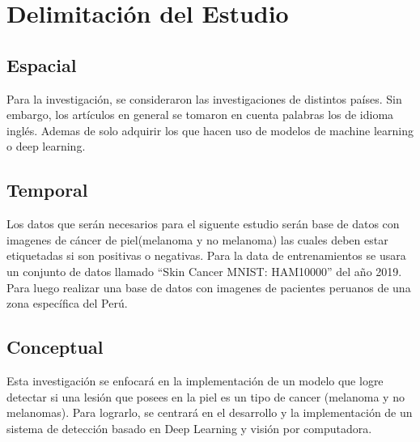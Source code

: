 \section{Delimitación del Estudio}

\subsection{Espacial}
Para la investigación, se consideraron las investigaciones de distintos países. Sin embargo, los artículos en general se tomaron en cuenta palabras los de idioma inglés. Ademas de solo adquirir los que hacen uso de modelos de machine learning o deep learning.

\subsection{Temporal}
Los datos que serán necesarios para el siguente estudio serán base de datos con imagenes de cáncer de piel(melanoma y no melanoma) las cuales deben estar etiquetadas si son positivas o negativas.
Para la data de entrenamientos se usara un conjunto de datos llamado “Skin Cancer MNIST: HAM10000” del año 2019. Para luego realizar una base de datos con imagenes de pacientes peruanos de una zona específica del Perú.


\subsection{Conceptual}
Esta investigación se enfocará en la implementación de un modelo que logre detectar si una lesión que posees en la piel es un tipo de cancer (melanoma y no melanomas). Para lograrlo, se centrará en el desarrollo y la implementación de un sistema de detección basado en Deep Learning y visión por computadora.


